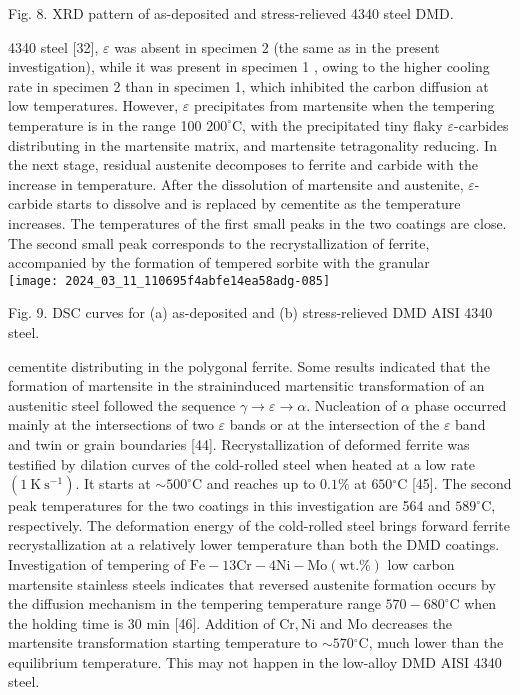 \documentclass[10pt]{article}
\begin{document}
Fig. 8. XRD pattern of as-deposited and stress-relieved 4340 steel DMD.

4340 steel [32], $\varepsilon$ was absent in specimen 2 (the same as in the present investigation), while it was present in specimen 1 , owing to the higher cooling rate in specimen 2 than in specimen 1, which inhibited the carbon diffusion at low temperatures. However, $\varepsilon$ precipitates from martensite when the tempering temperature is in the range 100 $200^{\circ} \mathrm{C}$, with the precipitated tiny flaky $\varepsilon$-carbides distributing in the martensite matrix, and martensite tetragonality reducing. In the next stage, residual austenite decomposes to ferrite and carbide with the increase in temperature. After the dissolution of martensite and austenite, $\varepsilon$-carbide starts to dissolve and is replaced by cementite as the temperature increases. The temperatures of the first small peaks in the two coatings are close. The second small peak corresponds to the recrystallization of ferrite, accompanied by the formation of tempered sorbite with the granular\\
\texttt{[image: 2024\_03\_11\_110695f4abfe14ea58adg-085]}

Fig. 9. DSC curves for (a) as-deposited and (b) stress-relieved DMD AISI 4340 steel.

cementite distributing in the polygonal ferrite. Some results indicated that the formation of martensite in the straininduced martensitic transformation of an austenitic steel followed the sequence $\gamma \rightarrow \varepsilon \rightarrow \alpha$. Nucleation of $\alpha$ phase occurred mainly at the intersections of two $\varepsilon$ bands or at the intersection of the $\varepsilon$ band and twin or grain boundaries [44]. Recrystallization of deformed ferrite was testified by dilation curves of the cold-rolled steel when heated at a low rate $\left(1 \mathrm{~K} \mathrm{~s}^{-1}\right)$. It starts at $\sim 500^{\circ} \mathrm{C}$ and reaches up to $0.1 \%$ at $650{ }^{\circ} \mathrm{C}$ [45]. The second peak temperatures for the two coatings in this investigation are 564 and $589^{\circ} \mathrm{C}$, respectively. The deformation energy of the cold-rolled steel brings forward ferrite recrystallization at a relatively lower temperature than both the DMD coatings. Investigation of tempering of $\mathrm{Fe}-13 \mathrm{Cr}-4 \mathrm{Ni}-\mathrm{Mo}(\mathrm{wt} . \%)$ low carbon martensite stainless steels indicates that reversed austenite formation occurs by the diffusion mechanism in the tempering temperature range $570-680^{\circ} \mathrm{C}$ when the holding time is 30 min [46]. Addition of $\mathrm{Cr}, \mathrm{Ni}$ and Mo decreases the martensite transformation starting temperature to $\sim 570{ }^{\circ} \mathrm{C}$, much lower than the equilibrium temperature. This may not happen in the low-alloy DMD AISI 4340 steel.
\end{document}

